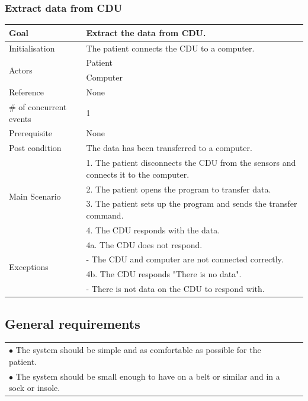 \subsubsection{Extract data from CDU}
\begin{table}[H]
	\centering
	\begin{tabular}{|l|p{10cm}|}
	\hline
	Goal 							& Extract the data from CDU.\\ \hline
	Initialisation 					& The patient connects the CDU to a computer. \\ \hline
	\multirow{2}{*}{Actors} 		& Patient \\ 
									& Computer \\\hline
	Reference 						& None \\ \hline
	\# of concurrent events 		& 1 \\ \hline
	Prerequisite  					& None \\ \hline
	Post condition 					& The data has been transferred to a computer. \\ \hline
	\multirow{4}{*}{Main Scenario} 	& 1. The patient disconnects the CDU from the sensors and connects it to the computer. \\
									& 2. The patient opens the program to transfer data.\\
									& 3. The patient sets up the program and sends the transfer command.\\ 
									& 4. The CDU responds with the data. \\ \hline
	\multirow{4}{*}{Exceptions} & 4a. The CDU does not respond. \\ 
								& - The CDU and computer are not connected correctly.\\											& 4b. The CDU responds "There is no data". \\
								& - There is not data on the CDU to respond with.\\\hline
	\end{tabular}
\end{table}



\subsection{General requirements}
\begin{table}[H]
\begin{tabular}{p{10cm} p{2cm}}
$\bullet$ The system should be simple and as comfortable as possible for the patient. & \\
$\bullet$ The system should be small enough to have on a belt or similar and in a sock or insole. &\\
\end{tabular}
\end{table}


